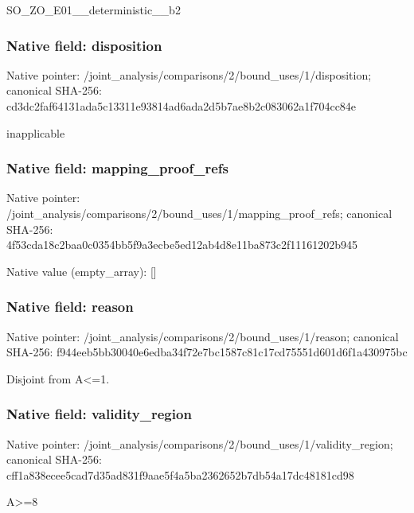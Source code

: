 \documentclass[10pt,a4paper]{article}
\begin{document}
\begingroup\raggedright\sloppy SO\_\allowbreak{}ZO\_\allowbreak{}E01\_\allowbreak{}\_\allowbreak{}deterministic\_\allowbreak{}\_\allowbreak{}b2\par\endgroup

\subsubsection{Native field: disposition}
Native pointer: /joint\_\allowbreak{}analysis/comparisons/2/bound\_\allowbreak{}uses/1/disposition; canonical SHA-256: cd3dc2faf64131ada5c13311e93814ad6ada2d5b7ae8b2c083062a1f704cc84e

\begingroup\raggedright\sloppy inapplicable\par\endgroup

\subsubsection{Native field: mapping\_\allowbreak{}proof\_\allowbreak{}refs}
Native pointer: /joint\_\allowbreak{}analysis/comparisons/2/bound\_\allowbreak{}uses/1/mapping\_\allowbreak{}proof\_\allowbreak{}refs; canonical SHA-256: 4f53cda18c2baa0c0354bb5f9a3ecbe5ed12ab4d8e11ba873c2f11161202b945

Native value (empty\_\allowbreak{}array): []

\subsubsection{Native field: reason}
Native pointer: /joint\_\allowbreak{}analysis/comparisons/2/bound\_\allowbreak{}uses/1/reason; canonical SHA-256: f944eeb5bb30040e6edba34f72e7bc1587c81c17cd75551d601d6f1a430975bc

\begingroup\raggedright\sloppy Disjoint from A<=\allowbreak{}1.\par\endgroup

\subsubsection{Native field: validity\_\allowbreak{}region}
Native pointer: /joint\_\allowbreak{}analysis/comparisons/2/bound\_\allowbreak{}uses/1/validity\_\allowbreak{}region; canonical SHA-256: cff1a838ecee5cad7d35ad831f9aae5f4a5ba2362652b7db54a17dc48181cd98

\begingroup\raggedright\sloppy A>=\allowbreak{}8\par\endgroup
\end{document}
